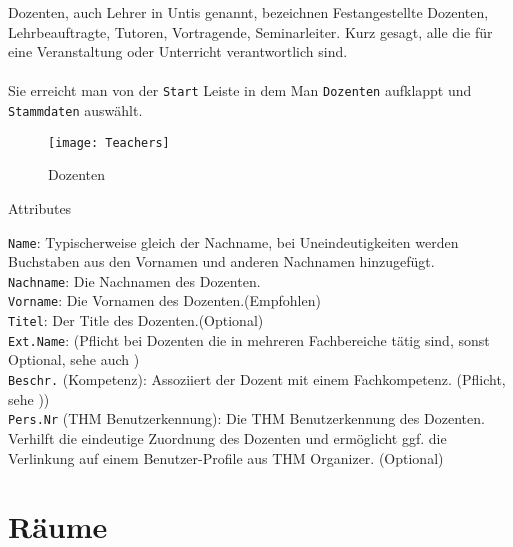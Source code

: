 Dozenten, auch Lehrer in Untis genannt, bezeichnen Festangestellte Dozenten, Lehrbeauftragte, Tutoren, Vortragende, Seminarleiter. Kurz gesagt, alle die für eine Veranstaltung oder Unterricht verantwortlich sind.\\
\\
Sie erreicht man von der \texttt{Start} Leiste in dem Man \texttt{Dozenten} aufklappt und \texttt{Stammdaten} auswählt.\\

\begin{figure}[h]
	\centering
	\texttt{[image: Teachers]}
	\vspace{-5pt}
	\caption{Dozenten}
	\label{fig:teachers}
\end{figure}

\noindent
{\large Attributes\par}
\vspace{8pt}

\noindent
\texttt{Name}: Typischerweise gleich der Nachname, bei Uneindeutigkeiten werden Buchstaben aus den Vornamen und anderen Nachnamen hinzugefügt.\\

\noindent
\texttt{Nachname}: Die Nachnamen des Dozenten.\\

\noindent
\texttt{Vorname}: Die Vornamen des Dozenten.(Empfohlen)\\

\noindent
\texttt{Titel}: Der Title des Dozenten.(Optional)\\

\noindent
\texttt{Ext.Name}: (Pflicht bei Dozenten die in mehreren Fachbereiche tätig sind, sonst Optional, sehe auch 
)\\

\noindent
\texttt{Beschr.} (Kompetenz): Assoziiert der Dozent mit einem Fachkompetenz. (Pflicht, sehe   ))\\

\noindent
\texttt{Pers.Nr} (THM Benutzerkennung): Die THM Benutzerkennung des Dozenten. Verhilft die eindeutige Zuordnung des Dozenten und ermöglicht ggf. die Verlinkung auf einem Benutzer-Profile aus THM Organizer. (Optional)\\

\section{Räume}

